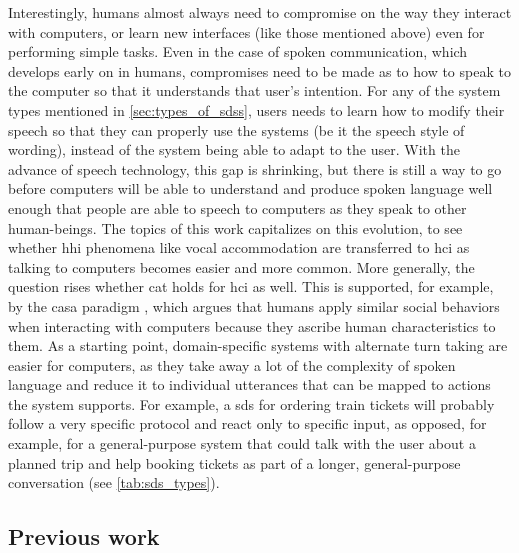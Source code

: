 Interestingly, humans almost always need to compromise on the way they interact with computers, or learn new interfaces (like those mentioned above) even for performing simple tasks.
Even in the case of spoken communication, which develops early on in humans, compromises need to be made as to how to speak to the computer so that it understands that user's intention.
For any of the system types mentioned in \cref{sec:types_of_sdss}, users needs to learn how to modify their speech so that they can properly use the systems (be it the speech style of wording), instead of the system being able to adapt to the user.
With the advance of speech technology, this gap is shrinking, but there is still a way to go before computers will be able to understand and produce spoken language well enough that people are able to speech to computers as they speak to other human-beings.
The topics of this work capitalizes on this evolution, to see whether \ac{hhi} phenomena like vocal accommodation are transferred to \ac{hci} as talking to computers becomes easier and more common.
More generally, the question rises whether \ac{cat} holds for \ac{hci} as well.
This is supported, for example, by the \ac{casa} paradigm \citep{Nass2000machines}, which argues that humans apply similar social behaviors when interacting with computers because they ascribe human characteristics to them.
As a starting point, domain-specific systems with alternate turn taking are easier for computers, as they take away a lot of the complexity of spoken language and reduce it to individual utterances that can be mapped to actions the system supports.
For example, a \ac{sds} for ordering train tickets will probably follow a very specific protocol and react only to specific input, as opposed, for example, for a general-purpose system that could talk with the user about a planned trip and help booking tickets as part of a longer, general-purpose conversation (see \cref{tab:sds_types}).

\subsection{Previous work}
\label{subsec:previous_work}



